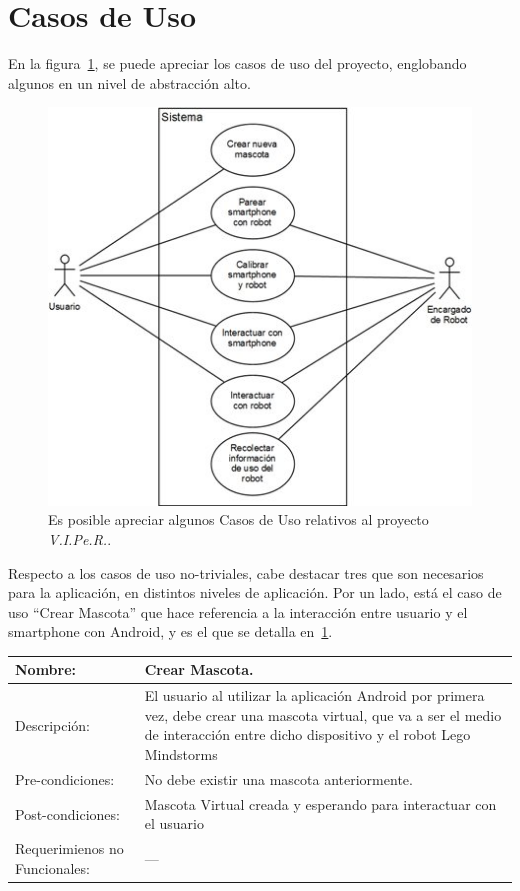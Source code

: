 \documentclass[letterpaper,12pt]{article} %
\numberwithin{equation}{section} %
\numberwithin{figure}{section} %
\numberwithin{table}{section} %
\begin{document}
\newpage
\section{Casos de Uso} %

En la figura~\ref{fig:CasoUso}, se puede apreciar los casos de uso del proyecto, englobando algunos en un nivel de abstracci\'on alto.

\begin{figure}[h!]
   \centering
     \includegraphics[scale=0.5]{CasoUso.jpg}
   \caption{Es posible apreciar algunos Casos de Uso relativos al proyecto \emph{V.I.Pe.R.}.}
   \label{fig:CasoUso}
\end{figure}

Respecto a los casos de uso no-triviales, cabe destacar tres que son necesarios para la aplicaci\'on, en distintos niveles de aplicaci\'on. Por un lado, est\'a el caso de uso ``Crear Mascota'' que hace referencia a la interacci\'on entre usuario y el smartphone con Android, y es el que se detalla en~\ref{tab:Crear}.

\begin{table}[hb!]
  \begin{tabular}{p{3cm}p{7cm}}\hline\hline
    Nombre: & Crear Mascota. \\ \hline
    Descripci\'on: & El usuario al utilizar la aplicaci\'on Android por primera vez, debe crear una mascota virtual, que va a ser el medio de interacci\'on entre dicho dispositivo y el robot Lego Mindstorms\\ \hline %
    Pre-condiciones: & No debe existir una mascota anteriormente.\\ \hline
    Post-condiciones: & Mascota Virtual creada y esperando para interactuar con el usuario\\ \hline
    Requerimienos no Funcionales: & ---\\ \hline\hline %
  \end{tabular}
  \label{tab:Crear}
\end{table}
\end{document}
